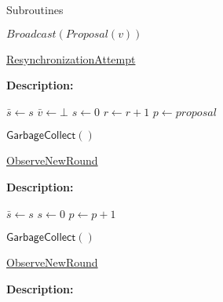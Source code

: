\documentclass[10pt,a4paper]{article}
\begin{document}
\begin{section}{Subroutines}
\begin{algorithm}[H]
\begin{algorithmic}[1]
        \State $Broadcast(Proposal(v))$
    \EndIf

    \EndFunction
    \end{algorithmic}
    \caption{\underline{ResynchronizationAttempt}}
\end{algorithm}

\noindent \textbf{Description:}\\


\begin{algorithm}[H]
    \begin{algorithmic}[1]


    \State $\bar{s} \gets s$
    \State $\bar{v} \gets \bot$
    \State $s \gets 0$
    \State $r \gets r+1$
    \State $p \gets proposal$

    \State $\mathsf{GarbageCollect}()$


    \EndFunction
    \end{algorithmic}
    \caption{\underline{ObserveNewRound}}
\end{algorithm}

\noindent \textbf{Description:}\\


\begin{algorithm}[H]
    \begin{algorithmic}[1]


    \State $\bar{s} \gets s$
    \State $s \gets 0$
    \State $p \gets p+1$

    \State $\mathsf{GarbageCollect}()$

    \EndFunction
    \end{algorithmic}
    \caption{\underline{ObserveNewRound}}
\end{algorithm}

\noindent \textbf{Description:}\\


\begin{algorithm}[H]
    \begin{algorithmic}[1]


\end{algorithmic}
\end{algorithm}
\end{section}
\end{document}
